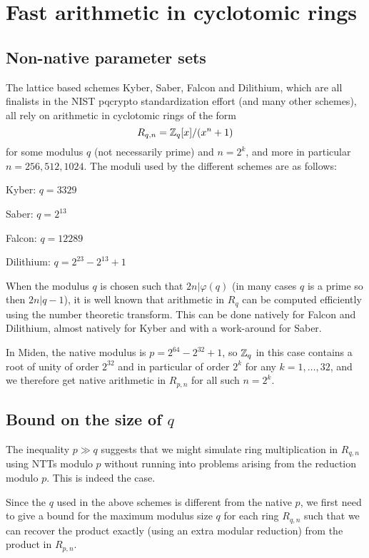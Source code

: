 \section{Fast arithmetic in cyclotomic rings}
\label{section:arithmetic}

\subsection{Non-native parameter sets}

The lattice based schemes Kyber, Saber, Falcon and Dilithium, which are all finalists in the NIST pqcrypto standardization
effort (and many other schemes), all rely on arithmetic in cyclotomic rings of the form
\[  R_{q,n} = \mathbb{Z}_q[x]/(x^n + 1)    \]
for some modulus $q$ (not necessarily prime) and $n = 2^k$, and more in particular $n = 256, 512, 1024$.
The moduli used by the different schemes are as follows:
\bit
\item Kyber: $q = 3329$
\item Saber: $q = 2^{13}$
\item Falcon: $q = 12289$
\item Dilithium: $q = 2^{23} - 2^{13} + 1$
\eit

When the modulus $q$ is chosen such that $2n | \varphi(q)$ (in many cases $q$ is a prime so then $2n | q-1$), 
it is well known that arithmetic in $R_q$ can be computed efficiently using the number theoretic transform.
This can be done natively for Falcon and Dilithium, almost natively for Kyber and with a work-around for Saber.

In Miden, the native modulus is $p = 2^{64} - 2^{32} + 1$, so $\mathbb{Z}_q$ in this case contains a root of unity 
of order $2^{32}$ and in particular of order $2^k$ for any $k = 1, \ldots, 32$, and we therefore get native
arithmetic in $R_{p,n}$ for all such $n = 2^k$.

\subsection{Bound on the size of $q$}

The inequality $p \gg q$ suggests that we might simulate ring multiplication in $R_{q,n}$ using NTTs modulo $p$ without running into problems arising from the reduction modulo $p$. This is indeed the case.

Since the $q$ used in the above schemes is different from the native $p$, we first need to give a bound for
the maximum modulus size $q$ for each ring $R_{q,n}$ such that we can recover the product exactly (using 
an extra modular reduction) from the product in $R_{p,n}$.

